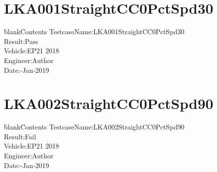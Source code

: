\documentclass[12pt]{report}
\begin{document}
\section{\label{w5}LKA001StraightCC0PctSpd30} 
\begin{CJK}{GBK}{kai} 
\begin{tabbing} 
\hspace*{40bp}\=blank\hspace*{80bp}\=Contents\kill 
 \>TestcaseName:\>LKA001StraightCC0PctSpd30\\ 
 \>Result:\>Pass\\ 
 \>Vehicle:\>EP21 2018\\ 
 \>Engineer:\>Author\\ 
 \>Date:-Jan-2019\\ 
\end{tabbing} 
\end{CJK} 
\begin{figure}[ht]  
\centering 
\begin{subfigure}{\texttt{[image: LKAfig10001.eps]}} 
\end{subfigure} 
\end{figure} 
\newpage 
\section{\label{w6}LKA002StraightCC0PctSpd90} 
\begin{CJK}{GBK}{kai} 
\begin{tabbing} 
\hspace*{40bp}\=blank\hspace*{80bp}\=Contents\kill 
 \>TestcaseName:\>LKA002StraightCC0PctSpd90\\ 
 \>Result:\>Fail\\ 
 \>Vehicle:\>EP21 2018\\ 
 \>Engineer:\>Author\\ 
 \>Date:-Jan-2019\\ 
\end{tabbing} 
\end{CJK} 
\begin{figure}[ht]  
\centering 
\begin{subfigure}{\texttt{[image: LKAfig10002.eps]}} 
\end{subfigure} 
\end{figure} 
\end{document}
